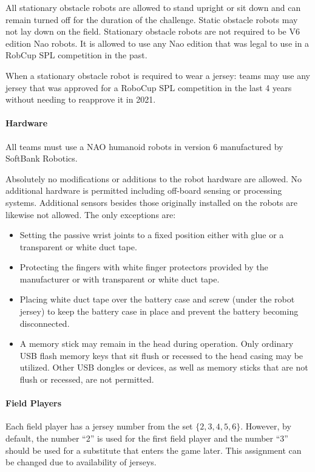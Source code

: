 All stationary obstacle robots are allowed to stand upright or sit down and can remain turned off for the duration of the challenge. Static obstacle robots may not lay down on the field. Stationary obstacle robots are not required to be V6 edition Nao robots. It is allowed to use any Nao edition that was legal to use in a RobCup SPL competition in the past.

When a stationary obstacle robot is required to wear a jersey: teams may use any jersey that was approved for a RoboCup SPL competition in the last 4 years without needing to reapprove it in 2021.

\paragraph{Hardware}
\label{sec:hardware}
All teams must use a NAO humanoid robots in version 6 manufactured by SoftBank Robotics.

Absolutely no modifications or additions to the robot hardware are allowed. No additional hardware is permitted including off-board sensing or processing systems. Additional sensors besides those originally installed on the robots are likewise not allowed. The only exceptions are:
\begin{itemize}
	\item Setting the passive wrist joints to a fixed position either with glue or a transparent or white duct tape.
	\item Protecting the fingers with white finger protectors provided by the manufacturer or with transparent or white duct tape.
	\item Placing white duct tape over the battery case and screw (under the robot jersey) to keep the battery case in place and prevent the battery becoming disconnected.
	\item A memory stick may remain in the head during operation.  Only ordinary USB flash memory keys that sit flush or recessed to the head casing may be utilized. Other USB dongles or devices, as well as memory sticks that are not flush or recessed, are not permitted.
\end{itemize}

\paragraph{Field Players}
\label{sec:field_players}
Each field player has a jersey number from the set $\{2, 3, 4, 5, 6\}$. However, by default, the number ``2'' is used for the first field player and the number ``3'' should be used for a substitute that enters the game later. This assignment can be changed due to availability of jerseys.

